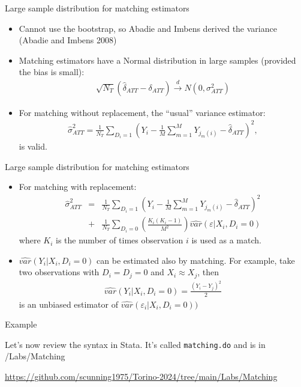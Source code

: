 \documentclass{beamer}
\begin{document}
\begin{frame}{Large sample distribution for matching estimators}
	
	\begin{itemize}
	\item Cannot use the bootstrap, so Abadie and Imbens derived the variance (Abadie and Imbens 2008)
	\item Matching estimators have a Normal distribution in large samples (provided the bias is small):
		\begin{eqnarray*}
		\sqrt{N_T} (\widehat{\delta}_{ATT} - \delta_{ATT}) \xrightarrow{d} N(0,\sigma^2_{ATT})
		\end{eqnarray*}
	\item For matching without replacement, the ``usual'' variance estimator:
		\begin{eqnarray*}
		\widehat{\sigma}^2_{ATT} = \frac{1}{N_T} \sum_{D_i=1} \left( Y_i - \frac{1}{M} \sum_{m=1}^M Y_{j_m(i)} - \widehat{\delta}_{ATT} \right)^2,
		\end{eqnarray*}is valid.
	\end{itemize}
\end{frame}

\begin{frame}{Large sample distribution for matching estimators}
	
	\begin{itemize}
	\item For matching with replacement:
		\begin{eqnarray*}
		\widehat{\sigma}^2_{ATT} &=& \frac{1}{N_T} \sum_{D_i=1} \left( Y_i - \frac{1}{M} \sum_{m=1}^M Y_{j_m(i)} - \widehat{\delta}_{ATT} \right)^2 \\
		&+& \frac{1}{N_T} \sum_{D_i=0} \left( \frac{K_i(K_i-1)}{M^2} \right) \widehat{var}(\varepsilon | X_i,D_i=0)
		\end{eqnarray*}where $K_i$ is the number of times observation $i$ is used as a match.
	\item $\widehat{var}(Y_i | X_i,D_i=0)$ can be estimated also by matching.  For example, take two observations with $D_i=D_j=0$ and $X_i \approx X_j$, then
		\begin{eqnarray*}
		\widehat{var}(Y_i | X_i,D_i=0) = \frac{(Y_i-Y_j)^2}{2}
		\end{eqnarray*}is an unbiased estimator of $\widehat{var}(\varepsilon_i | X_i,D_i=0))$
	\end{itemize}
\end{frame}

\begin{frame}{Example}

Let's now review the syntax in Stata.  It's called \texttt{matching.do} and is in /Labs/Matching 

\bigskip

\url{https://github.com/scunning1975/Torino-2024/tree/main/Labs/Matching}

\end{frame}
\end{document}
